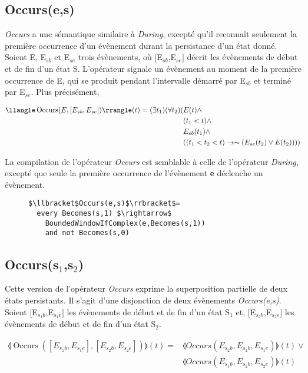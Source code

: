 \subsection*{Occurs(e,s)}
{\em Occurs} a une sémantique similaire à {\em During}, excepté qu'il reconnaît seulement la première occurrence d'un évènement durant la persistance d'un état donné.
Soient E, E$_{sb}$ et E$_{se}$ trois évènements, où $[$E$_{sb}$,E$_{se}]$ décrit les évènements de début et de fin d'un état S. L'opérateur signale un évènement au moment de la première occurrence de E, qui se produit pendant l'intervalle démarré par E$_{sb}$ et terminé par E$_{se}$. 
Plus précisément,
\begin{small}
\begin{equation*}
\begin{split}
\llangle\operatorname{Occurs}(E,[E_{sb},E_{se}])\rrangle(t)=(\exists t_1)(\forall t_2)(&E(t)\wedge \\
&(t_1<t) \wedge\\
&E_{sb}(t_1)\wedge \\
&((t_1<t_2<t)\rightarrow \thicksim (E_{se}(t_2) \vee E(t_2))))
\end{split}
\end{equation*}
\end{small}

La compilation de l'opérateur {\em Occurs} est semblable à celle de l'opérateur {\em During}, excepté que seule la première occurrence de l'évènement {\tt e} déclenche un évènement. 
\begin{figure}
\begin{lstlisting}[language=EPLPseudoCodeCompile]
$\llbracket$Occurs(e,s)$\rrbracket$= 
  every Becomes(s,1) $\rightarrow$ 
    BoundedWindowIfComplex(e,Becomes(s,1))
    and not Becomes(s,0)
\end{lstlisting}
\end{figure}


\subsection*{Occurs(s$_1$,s$_2$)}
Cette version de l'opérateur {\em Occurs} exprime la superposition partielle de deux états persistants. Il s'agit d'une disjonction de deux évènements {\em Occurs(e,s)}.
Soient $[$E$_{s_{1}b}$,E$_{s_{1}e}]$ les évènements de début et de fin d'un état S$_1$ et, $[$E$_{s_{2}b}$,E$_{s_{2}e}]$ les évènements de début et de fin d'un état S$_2$. 
\begin{small}
\begin{equation*}
\begin{split}
\llangle\operatorname{Occurs}([E_{s_{1}b},E_{s_{1}e}],[E_{s_{2}b},E_{s_{2}e}])\rrangle(t)=&\llangle Occurs(E_{s_{2}b},E_{s_{1}b},E_{s_{1}e})\rrangle(t)\vee\\
& \llangle Occurs(E_{s_{1}b},E_{s_{2}b},E_{s_{2}e})\rrangle(t)
\end{split}
\end{equation*}
\end{small}

